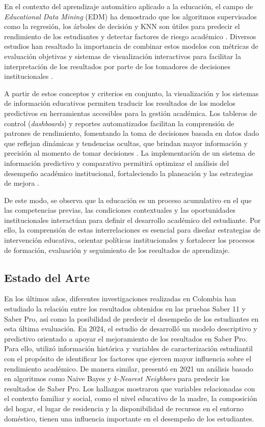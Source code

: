 En el contexto del aprendizaje automático aplicado a la educación, el campo de \textit{Educational Data Mining} (EDM) ha demostrado que los algoritmos supervisados como la regresión, los árboles de decisión y KNN son útiles para predecir el rendimiento de los estudiantes y detectar factores de riesgo académico
\cite{ozyurt2023educational}. Diversos estudios han resaltado la importancia de combinar estos modelos con métricas de
evaluación objetivas y sistemas de visualización interactivos para facilitar la interpretación de los resultados
por parte de los tomadores de decisiones institucionales \cite{ozyurt2023educational}.

A partir de estos conceptos y criterios en conjunto, la visualización y los sistemas de información educativos permiten traducir los resultados de los modelos predictivos en herramientas accesibles para la gestión académica. Los tableros de control (\textit{dashboards}) y reportes automatizados facilitan la comprensión de patrones de rendimiento, fomentando la toma de decisiones basada en datos dado que reflejan dinámicas y tendencias ocultas, que brindan mayor información y precisión al momento de tomar decisiones \cite{alamri2021explainable}. La implementación de un sistema de información predictivo y comparativo permitirá optimizar el análisis del desempeño académico institucional, fortaleciendo la planeación y las estrategias de mejora \cite{alamri2021explainable}.

De este modo, se observa que la educación es un proceso acumulativo en el que las competencias previas,
las condiciones contextuales y las oportunidades institucionales interactúan para definir el desarrollo
académico del estudiante. Por ello, la comprensión de estas interrelaciones es esencial para diseñar
estrategias de intervención educativa, orientar políticas institucionales y fortalecer los procesos de
formación, evaluación y seguimiento de los resultados de aprendizaje.

\subsection{Estado del Arte}

En los últimos años, diferentes investigaciones realizadas en Colombia han estudiado la relación entre los resultados obtenidos en las pruebas Saber 11 y Saber Pro, así como la posibilidad de predecir el desempeño de los estudiantes en esta última evaluación. En 2024, el estudio de \cite{mendieta2024modelo} desarrolló un modelo descriptivo y predictivo orientado a apoyar el mejoramiento de los resultados en Saber Pro. Para ello, utilizó información histórica y variables de caracterización estudiantil con el propósito de identificar los factores que ejercen mayor influencia sobre el rendimiento académico. De manera similar, \cite{cervera2021modelo} presentó en 2021 un análisis basado en algoritmos como Naive Bayes y \textit{k-Nearest Neighbors} para predecir los resultados de Saber Pro. Los hallazgos mostraron que variables relacionadas con el contexto familiar y social, como el nivel educativo de la madre, la composición del hogar, el lugar de residencia y la disponibilidad de recursos en el entorno doméstico, tienen una influencia importante en el desempeño de los estudiantes.

